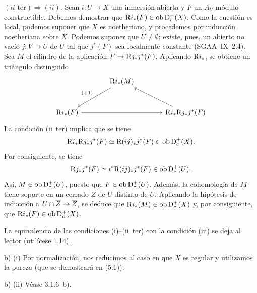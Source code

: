 $(ii\text{~ter}) \Rightarrow (ii)$. Sean $i : U \to X$ una inmersión abierta y $F$ un $A_U$-módulo constructible. Debemos demostrar que $\mathrm{R} i_{*}(F) \in \operatorname{ob} \mathrm{D}_c^{+}(X)$. Como la cuestión es local, podemos suponer que $X$ es noetheriano, y procedemos por inducción noetheriana sobre $X$. Podemos suponer que $U \neq \emptyset$; existe, pues, un abierto no vacío $j : V \to U$ de $U$ tal que $j^{*}(F)$ sea localmente constante (SGAA~IX~2.4). Sea $M$ el cilindro de la aplicación $F \to \mathrm{R} j_{*}j^{*}(F)$. Aplicando $\mathrm{R} i_{*}$, se obtiene un triángulo distinguido
\[
\begin{tikzcd}[column sep=large,row sep=large]
& \R i_{*}(M) \arrow[dl,"{(+1)}"'] & \\
\R i_{*}(F) \arrow[rr] & & \R i_{*}\R j_{*}j^{*}(F) \arrow[ul]
\end{tikzcd}
\]
La condición (ii~ter) implica que se tiene
\[
\mathrm{R} i_{*} \mathrm{R} j_{*} j^{*}(F) \simeq \mathrm{R}(ij)_{*} j^{*}(F) \in \operatorname{ob} \mathrm{D}_c^{+}(X).
\]
Por consiguiente, se tiene
\[
\mathrm{R} j_{*}j^{*}(F) \simeq i^{*} \mathrm{R}(ij)_{*} j^{*}(F) \in \operatorname{ob} \mathrm{D}_c^{+}(U).
\]
Así, $M \in \operatorname{ob} \mathrm{D}_c^{+}(U)$, puesto que $F \in \operatorname{ob} \mathrm{D}_c^{+}(U)$. Además, la cohomología de $M$ tiene soporte en un cerrado $Z$ de $U$ distinto de $U$. Aplicando la hipótesis de inducción a $U \cap \overline{Z} \to \overline{Z}$, se deduce que $\mathrm{R} i_{*}(M) \in \operatorname{ob} \mathrm{D}_c^{+}(X)$ y, por consiguiente, que $\mathrm{R} i_{*}(F) \in \operatorname{ob} \mathrm{D}_c^{+}(X)$.

La equivalencia de las condiciones (i)--(ii~ter) con la condición (iii) se deja al lector (utilícese 1.14).

b) (i) Por normalización, nos reducimos al caso en que $X$ es regular y utilizamos la pureza (que se demostrará en (5.1)).

b) (ii) Véase 3.1.6~b).
